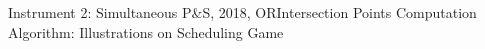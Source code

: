 \documentclass[14pt]{beamer}
\begin{document}
\begin{frame}{Instrument 2: Simultaneous P\&S, {\footnotesize 2018, OR}}{Intersection Points Computation Algorithm: Illustrations on Scheduling Game}
\small
\vspace{-7mm}
\begin{figure}[t]
	\label{figure:IPCExample1}
	\vspace{-8mm}
\end{figure}
\end{frame}
\end{document}
